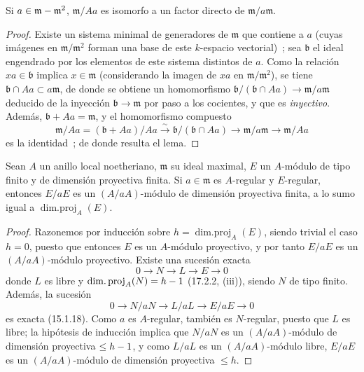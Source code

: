 \begin{lemma}[17.3.1.3]
\label{0.17.3.1.3-fr}
Si $a\in\mathfrak{m}-\mathfrak{m}^2$, $\mathfrak{m}/Aa$ es isomorfo a un
factor directo de $\mathfrak{m}/a\mathfrak{m}$.
\end{lemma}

\begin{proof}
Existe un sistema minimal de generadores de $\mathfrak{m}$ que contiene a $a$
(cuyas imágenes en $\mathfrak{m}/\mathfrak{m}^2$ forman una base de este
$k$-espacio vectorial)~; sea $\mathfrak{b}$ el ideal engendrado por los elementos
de este sistema distintos de $a$. Como la relación $xa\in\mathfrak{b}$ implica
$x\in\mathfrak{m}$ (considerando la imagen de $xa$ en
$\mathfrak{m}/\mathfrak{m}^2$), se tiene
$\mathfrak{b}\cap Aa\subset a\mathfrak{m}$, de donde se obtiene un homomorfismo
$\mathfrak{b}/(\mathfrak{b}\cap Aa)\longrightarrow
\mathfrak{m}/a\mathfrak{m}$ deducido de la inyección
$\mathfrak{b}\longrightarrow\mathfrak{m}$ por paso a los cocientes, y que
es \emph{inyectivo}. Además, $\mathfrak{b}+Aa=\mathfrak{m}$, y
el homomorfismo compuesto
\[
  \mathfrak{m}/Aa=(\mathfrak{b}+Aa)/Aa
  \xrightarrow{\sim}\mathfrak{b}/(\mathfrak{b}\cap Aa)
  \longrightarrow\mathfrak{m}/a\mathfrak{m}
  \longrightarrow\mathfrak{m}/Aa
\]
es la identidad~; de donde resulta el lema.
\end{proof}

\begin{lemma}[17.3.1.4]
\label{0.17.3.1.4-fr}
Sean $A$ un anillo local noetheriano, $\mathfrak{m}$ su ideal maximal, $E$
un $A$-módulo de tipo finito y de dimensión proyectiva finita. Si
$a\in\mathfrak{m}$ es $A$-regular y $E$-regular, entonces $E/aE$ es un
$(A/aA)$-módulo de dimensión proyectiva finita, a lo sumo igual a
$\operatorname{dim.proj}_A(E)$.
\end{lemma}
\begin{proof}
Razonemos por inducción sobre $h=\operatorname{dim.proj}_A(E)$, siendo trivial
el caso $h=0$, puesto que entonces $E$ es un $A$-módulo proyectivo, y por tanto
$E/aE$ es un $(A/aA)$-módulo proyectivo. Existe una sucesión exacta
\[
  0\longrightarrow N\longrightarrow L\longrightarrow E\longrightarrow0
\]
donde $L$ es libre y $\operatorname{dim.proj}_A(N)=h- 1$ (17.2.2, (iii)), siendo
$N$ de tipo finito. Además, la sucesión
\[
  0\longrightarrow N/aN\longrightarrow L/aL\longrightarrow E/aE
  \longrightarrow0
\]
es exacta (15.1.18). Como $a$ es $A$-regular, también es $N$-regular, puesto
que $L$ es libre; la hipótesis de inducción implica que $N/aN$ es un
$(A/aA)$-módulo de dimensión proyectiva $\leq h- 1$, y como $L/aL$ es un
$(A/aA)$-módulo libre, $E/aE$ es un $(A/aA)$-módulo de dimensión proyectiva
$\leq h$.
\end{proof}

